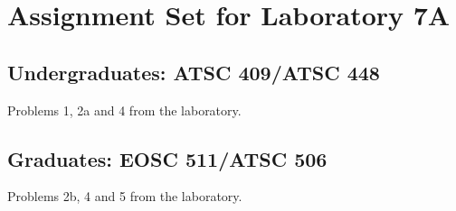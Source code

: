 \documentclass[12pt]{article}
\begin{document}
\section*{Assignment Set for Laboratory 7A}

\subsection*{Undergraduates: ATSC 409/ATSC 448}

Problems 1, 2a and 4 from the laboratory.

\subsection*{Graduates: EOSC 511/ATSC 506}

Problems 2b, 4 and 5 from the laboratory. 
\end{document}
